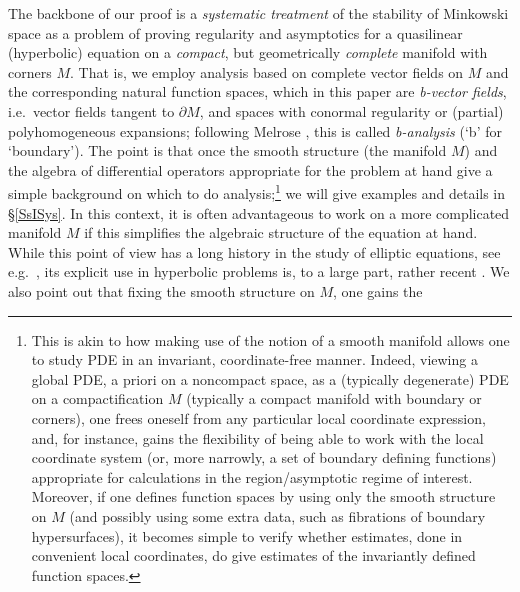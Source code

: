 \documentclass[reqno,11pt,letterpaper]{amsart}
\numberwithin{equation}{section}
\numberwithin{figure}{section}
\theoremstyle{definition}
\theoremstyle{remark}
\newcommand{\pa}{\partial}
\begin{document}
The backbone of our proof is a \emph{systematic treatment} of the stability of Minkowski space as a problem of proving regularity and asymptotics for a quasilinear (hyperbolic) equation on a \emph{compact}, but geometrically \emph{complete} manifold with corners $M$. That is, we employ analysis based on complete vector fields on $M$ and the corresponding natural function spaces, which in this paper are \emph{b-vector fields}, i.e.\ vector fields tangent to $\pa M$, and spaces with conormal regularity or (partial) polyhomogeneous expansions; following Melrose \cite{MelroseAPS,MelroseDiffOnMwc}, this is called \emph{b-analysis} (`b' for `boundary'). The point is that once the smooth structure (the manifold $M$) and the algebra of differential operators appropriate for the problem at hand give a simple background on which to do analysis;\footnote{This is akin to how making use of the notion of a smooth manifold allows one to study PDE in an invariant, coordinate-free manner. Indeed, viewing a global PDE, a priori on a noncompact space, as a (typically degenerate) PDE on a compactification $M$ (typically a compact manifold with boundary or corners), one frees oneself from any particular local coordinate expression, and, for instance, gains the flexibility of being able to work with the local coordinate system (or, more narrowly, a set of boundary defining functions) appropriate for calculations in the region/asymptotic regime of interest. Moreover, if one defines function spaces by using only the smooth structure on $M$ (and possibly using some extra data, such as fibrations of boundary hypersurfaces), it becomes simple to verify whether estimates, done in convenient local coordinates, do give estimates of the invariantly defined function spaces.} we will give examples and details in \S\ref{SsISys}. In this context, it is often advantageous to work on a more complicated manifold $M$ if this simplifies the algebraic structure of the equation at hand. While this point of view has a long history in the study of elliptic equations, see e.g.~\cite{MazzeoMelroseHyp,MelroseAPS,SchulzePsdoSing,MazzeoEdge,GilSchulzeSeilerEdge}, its explicit use in hyperbolic problems is, to a large part, rather recent \cite{MelroseEuclideanSpectralTheory,VasyThreeBody,MelroseWunschConic,MelroseVasyWunschDiffraction,BaskinVasyWunschRadMink,BaskinVasyWunschRadMink2,HintzVasySemilinear,HintzQuasilinearDS,HintzVasyQuasilinearKdS,HintzVasyKdSStability}. We also point out that fixing the smooth structure on $M$, one gains the 
\end{document}
